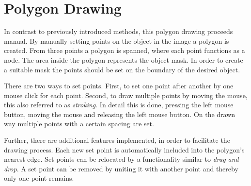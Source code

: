 
\section{Polygon Drawing}\label{ord:ch3:sec1}

In contrast to previously introduced methods, this polygon drawing proceeds manual.
By manually setting points on the object in the image a polygon is created.
From three points a polygon is spanned, where each point functions as a node.
The area inside the polygon represents the object mask.
In order to create a suitable mask the points should be set on the boundary of the desired object.

There are two ways to set points.
First, to set one point after another by one mouse click for each point.
Second, to draw multiple points by moving the mouse, this also referred to as \textit{stroking}.
In detail this is done, pressing the left mouse button, moving the mouse and releasing the left mouse button.
On the drawn way multiple points with a certain spacing are set.

Further, there are additional features implemented, in order to facilitate the drawing process.
Each new set point is automatically included into the polygon's nearest edge.
Set points can be relocated by a functionality similar to \textit{drag and drop}.
A set point can be removed by uniting it with another point and thereby only one point remains.

